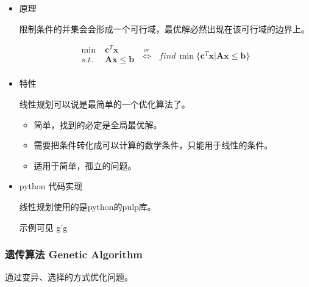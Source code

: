 \documentclass{article}
\begin{document}
\begin{itemize}

\item{原理}

限制条件的并集会会形成一个可行域，最优解必然出现在该可行域的边界上。

\begin{equation}
    \begin{split}
        \min &\; \mathbf{c}^T\mathbf{x} \\
        s.t. &\; \mathbf{Ax} \leqslant \mathbf{b} \\
    \end{split}
    \;\stackrel{or}{\Leftrightarrow}\;
    \begin{split}
        find\,\min \{\mathbf{c}^T\mathbf{x} | \mathbf{Ax} \leqslant \mathbf{b}\}
    \end{split}
\end{equation}

\item{特性}

线性规划可以说是最简单的一个优化算法了。

\begin{itemize}
    \item 简单，找到的必定是全局最优解。
    \item 需要把条件转化成可以计算的数学条件，只能用于线性的条件。
    \item 适用于简单，孤立的问题。
\end{itemize}

\item{python 代码实现}

线性规划使用的是python的pulp库。

示例可见
g'g
\end{itemize}

\subsubsection{遗传算法 Genetic Algorithm}

通过变异、选择的方式优化问题。
\end{document}
